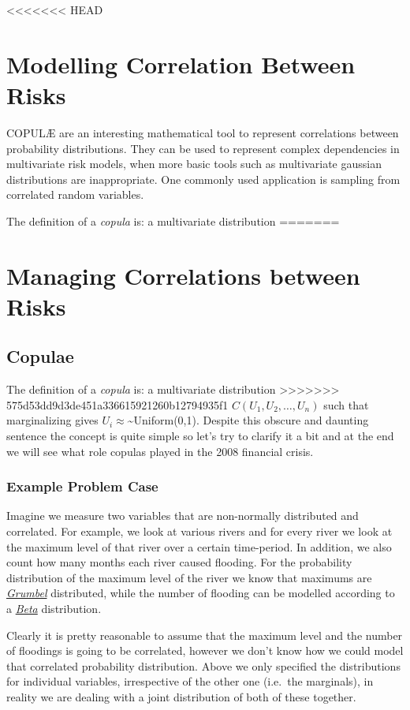 <<<<<<< HEAD
\chapter{Modelling Correlation Between Risks}

COPULÆ are an interesting mathematical tool to represent correlations between probability distributions. They can be used to represent complex dependencies in multivariate risk models, when more basic tools such as multivariate gaussian distributions are inappropriate. One commonly used application is sampling from correlated random variables.

    The definition of a \emph{copula} is: a multivariate distribution
=======
\chapter{Managing Correlations between Risks}

\section{Copulae}

The definition of a \emph{copula} is: a multivariate distribution
>>>>>>> 575d53dd9d3de451a336615921260b12794935f1
\(C(U_1, U_2, \ldots, U_n)\) such that marginalizing gives
\(U_i \approx\)\textasciitilde{}Uniform(0,1). Despite this obscure and
daunting sentence the concept is quite simple so let's try to clarify it
a bit and at the end we will see what role copulas played in the 2008
financial crisis.

\subsection{Example Problem Case}\label{example-problem-case}

Imagine we measure two variables that are non-normally distributed and
correlated. For example, we look at various rivers and for every river
we look at the maximum level of that river over a certain time-period.
In addition, we also count how many months each river caused flooding.
For the probability distribution of the maximum level of the river we
know that maximums are \href{}{\emph{Grumbel}} distributed, while the
number of flooding can be modelled according to a \href{}{\emph{Beta}}
distribution.

Clearly it is pretty reasonable to assume that the maximum level and the
number of floodings is going to be correlated, however we don't know how
we could model that correlated probability distribution. Above we only
specified the distributions for individual variables, irrespective of
the other one (i.e.~the marginals), in reality we are dealing with a
joint distribution of both of these together.

